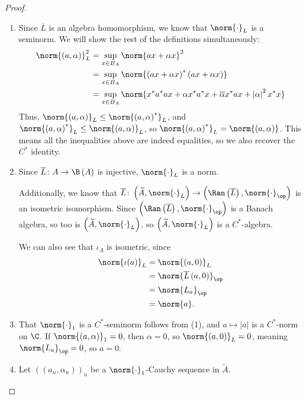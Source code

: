 \documentclass[10pt]{mypackage}
\begin{document}
\begin{proof}\hfill
  \begin{enumerate}[(1)]
    \item Since $\overline{L}$ is an algebra homomorphism, we know that $\norm{\cdot}_L$ is a seminorm. We will show the rest of the definitions simultaneously:
      \begin{align*}
        \norm{\left(a,\alpha\right)}_L^2 &= \sup_{x\in B_A}\norm{ax + \alpha x}^2\\
                                         &= \sup_{x\in B_A}\norm{\left(ax + \alpha x\right)^{\ast}\left(ax + \alpha x\right)}\\
                                         &= \sup_{x\in B_A}\norm{x^{\ast}a^{\ast}ax + \alpha x^{\ast}a^{\ast}x + \overline{\alpha}x^{\ast}ax + \left\vert \alpha \right\vert^2 x^{\ast}x}
      \end{align*}
      Thus, $\norm{\left(a,\alpha\right)}_L \leq \norm{\left(a,\alpha\right)^{\ast}}_L$, and $\norm{\left(a,\alpha\right)^{\ast}}_L\leq \norm{\left(a,\alpha\right)}_L$, so $\norm{\left(a,\alpha\right)^{\ast}}_L = \norm{\left(a,\alpha\right)}$. This means all the inequalities above are indeed equalities, so we also recover the $C^{\ast}$ identity.
    \item Since $\overline{L}\colon A\rightarrow \B\left(A\right)$ is injective, $\norm{\cdot}_L$ is a norm.\newline

      Additionally, we know that $\overline{L}\colon \left(\widetilde{A},\norm{\cdot}_L\right) \rightarrow \left(\Ran\left(\overline{L}\right),\norm{\cdot}_{\op}\right)$ is an isometric isomorphism. Since $\left(\Ran\left(\overline{L}\right),\norm{\cdot}_{\op}\right)$ is a Banach algebra, so too is $\left(\widetilde{A},\norm{\cdot}_L\right)$, so $\left(\widetilde{A},\norm{\cdot}_L\right)$ is a $C^{\ast}$-algebra.\newline

      We can also see that $\iota_A$ is isometric, since
      \begin{align*}
        \norm{\iota(a)}_L &= \norm{\left(a,0\right)}_L\\
                          &= \norm{\overline{L}\left(a,0\right)}_{\op}\\
                          &= \norm{L_a}_{\op}\\
                          &= \norm{a}.
      \end{align*}
    \item That $\norm{\cdot}_1$ is a $C^{\ast}$-seminorm follows from (1), and $a\mapsto \left\vert a \right\vert$ is a $C^{\ast}$-norm on $\C$. If $\norm{\left(a,\alpha\right)}_1 = 0$, then $\alpha = 0$, so $\norm{\left(a,0\right)}_L = 0$, meaning $\norm{L_a}_{\op} = 0$, so $a = 0$.
    \item Let $\left(\left(a_n,\alpha_n\right)\right)_n$ be a $\norm{\cdot}_1$-Cauchy sequence in $\widetilde{A}$.\newline


\end{enumerate}
\end{proof}
\end{document}
